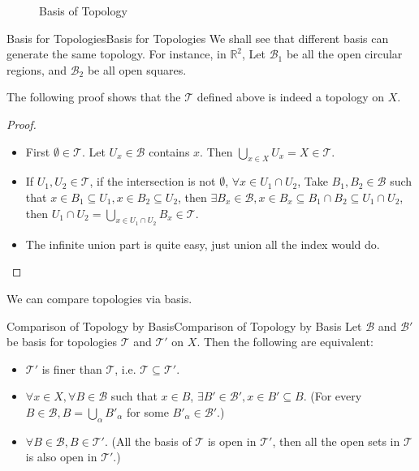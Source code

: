 \documentclass[../main.tex]{subfiles}
\begin{document}
\begin{figure}[ht]
    \centering
    \caption{Basis of Topology}
    \label{fig:basis-of-topology}
\end{figure}

\begin{example}{Basis for Topologies}{Basis for Topologies}
We shall see that different basis can generate the same topology. For instance, in $\mathbb{R}^2$, Let $\mathcal{B}_1$ be all the open circular regions, and $\mathcal{B}_2$ be all open squares.
\end{example}

The following proof shows that the $\mathcal{T}$ defined above is indeed a topology on $X$.
\begin{proof}
\begin{itemize}
\item First $\emptyset \in \mathcal{T}$. Let $U_x\in \mathcal{B}$ contains $x$. Then $\bigcup_{x\in X}U_x =X \in \mathcal{T}$.
\item If $U_1,U_2\in \mathcal{T}$, if the intersection is not $\emptyset $, $\forall x\in U_1\cap U_2$, Take $B_1,B_2\in \mathcal{B}$ such that $x\in B_1 \subseteq U_1, x\in B_2 \subseteq U_2$, then $\exists B_x\in \mathcal{B}, x\in B_x \subseteq B_1\cap B_2 \subseteq U_1\cap U_2$, then $U_1\cap U_2 = \bigcup_{x\in U_1\cap U_2} B_x \in \mathcal{T}$.
\item The infinite union part is quite easy, just union all the index would do.
\end{itemize}
\end{proof}

We can compare topologies via basis.

\begin{lemma}{Comparison of Topology by Basis}{Comparison of Topology by Basis}
Let $\mathcal{B}$ and $\mathcal{B}'$ be basis for topologies  $\mathcal{T}$ and $\mathcal{T}'$ on $X$. Then the following are equivalent:
\begin{itemize}
\item $\mathcal{T}'$ is finer than $\mathcal{T}$, i.e. $\mathcal{T} \subseteq \mathcal{T}'$.
\item $\forall x\in X,\forall B\in \mathcal{B}$ such that $x\in B$, $\exists B'\in \mathcal{B}', x\in B' \subseteq B$. (For every $B\in \mathcal{B}, B = \bigcup_{\alpha} B'_{\alpha}$ for some $B'_{\alpha}\in \mathcal{B}'$.)
\item $\forall B\in \mathcal{B},B\in \mathcal{T}'$. (All the basis of $\mathcal{T}$ is open in $\mathcal{T}'$, then all the open sets in $\mathcal{T}$ is also open in $\mathcal{T}'$.)
\end{itemize}
\end{lemma}
\end{document}
